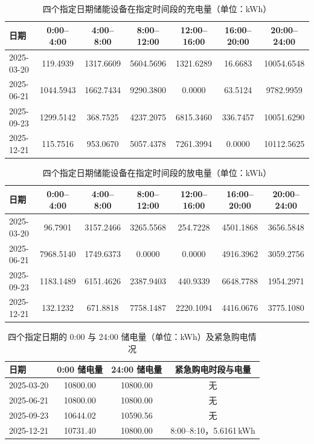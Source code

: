 \begin{table}[!htbp]
\caption{四个指定日期储能设备在指定时间段的充电量（单位：kWh）}\label{tab:q2-ch}
\centering
\small
\begin{tabular}{lcccccc}
\toprule
日期 & 0:00--4:00 & 4:00--8:00 & 8:00--12:00 & 12:00--16:00 & 16:00--20:00 & 20:00--24:00 \\
\midrule
2025-03-20 & 119.4939 & 1317.6609 & 5604.5696 & 1321.6289 & 16.6683 & 10054.6548 \\
2025-06-21 & 1044.5943 & 1662.7434 & 9290.3800 & 0.0000 & 63.5124 & 9782.9959 \\
2025-09-23 & 1299.5142 & 368.7525 & 4237.2075 & 6815.3460 & 336.7457 & 10051.6290 \\
2025-12-21 & 115.7516 & 953.0670 & 5057.4378 & 7261.3994 & 0.0000 & 10112.5625 \\
\bottomrule
\end{tabular}
\end{table}

\begin{table}[!htbp]
\caption{四个指定日期储能设备在指定时间段的放电量（单位：kWh）}\label{tab:q2-dis}
\centering
\small
\begin{tabular}{lcccccc}
\toprule
日期 & 0:00--4:00 & 4:00--8:00 & 8:00--12:00 & 12:00--16:00 & 16:00--20:00 & 20:00--24:00 \\
\midrule
2025-03-20 & 96.7901 & 3157.2466 & 3265.5568 & 254.7228 & 4501.1868 & 3656.5848 \\
2025-06-21 & 7968.5140 & 1749.6373 & 0.0000 & 0.0000 & 4916.3962 & 3059.2756 \\
2025-09-23 & 1183.1489 & 6151.4626 & 2387.9403 & 440.9339 & 6648.7788 & 1954.2971 \\
2025-12-21 & 132.1232 & 671.8818 & 7758.1487 & 2220.1094 & 4416.0676 & 3775.1080 \\
\bottomrule
\end{tabular}
\end{table}

\begin{table}[!htbp]
\caption{四个指定日期的 0:00 与 24:00 储电量（单位：kWh）及紧急购电情况}\label{tab:q2-emerg}
\centering
\small
\begin{tabular}{lccc}
\toprule
日期 & 0:00 储电量 & 24:00 储电量 & 紧急购电时段与电量 \\
\midrule
2025-03-20 & 10800.00 & 10800.00 & 无 \\
2025-06-21 & 10800.00 & 10800.00 & 无 \\
2025-09-23 & 10644.02 & 10590.56 & 无 \\
2025-12-21 & 10731.40 & 10800.00 & 8:00--8:10，5.6161\,kWh \\
\bottomrule
\end{tabular}
\end{table}

